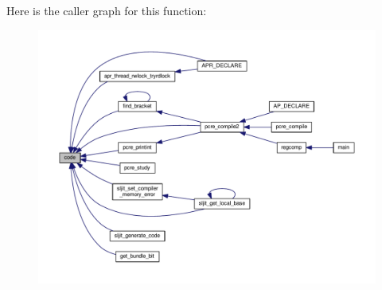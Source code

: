 Here is the caller graph for this function\+:
\nopagebreak
\begin{figure}[H]
\begin{center}
\leavevmode
\includegraphics[width=350pt]{README_8txt_aef5b02fe2e73c9ebbe67d741d711f85c_icgraph}
\end{center}
\end{figure}


